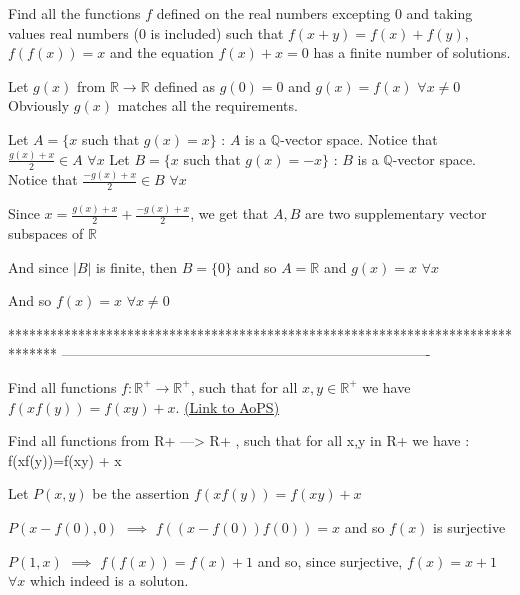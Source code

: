 \begin{solution}
	\begin{tcolorbox}Find all the functions  $ f $ defined on the real numbers excepting $ 0 $ and taking values real numbers ($ 0 $ is included) such that $ f(x+y)=f(x)+f(y) $, $ f(f(x))=x $ and the equation $ f(x)+x=0 $ has a finite number of solutions.\end{tcolorbox}
Let $g(x)$ from $\mathbb R\to\mathbb R$ defined as $g(0)=0$ and $g(x)=f(x)$ $\forall x\ne 0$
Obviously $g(x)$ matches all the requirements.

Let $A=\{x$ such that $g(x)=x\}$ : $A$ is a $\mathbb Q$-vector space. Notice that $\frac{g(x)+x}2\in A$ $\forall x$
Let $B=\{x$ such that $g(x)=-x\}$ : $B$ is a $\mathbb Q$-vector space. Notice that $\frac{-g(x)+x}2\in B$ $\forall x$

Since $x=\frac{g(x)+x}2+\frac{-g(x)+x}2$, we get that $A,B$ are two supplementary vector subspaces of $\mathbb R$

And since $|B|$ is finite, then $B=\{0\}$ and so $A=\mathbb R$ and $g(x)=x$ $\forall x$

And so $\boxed{f(x)=x}$ $\forall x\ne 0$
\end{solution}
*******************************************************************************
-------------------------------------------------------------------------------

\begin{problem}
	Find all functions $f: \mathbb{R}^+ \to \mathbb{R}^+ $, such that for all $x,y \in \mathbb{R}^+$  we have $f(xf(y))=f(xy) + x$.
	\flushright \href{https://artofproblemsolving.com/community/c6h450571}{(Link to AoPS)}
\end{problem}



\begin{solution}
	\begin{tcolorbox}Find all functions from R+ ---> R+ , such that for all x,y in R+ we have :
f(xf(y))=f(xy) + x\end{tcolorbox}
Let $P(x,y)$ be the assertion $f(xf(y))=f(xy)+x$

$P(x-f(0),0)$ $\implies$ $f((x-f(0))f(0))=x$ and so $f(x)$ is surjective

$P(1,x)$ $\implies$ $f(f(x))=f(x)+1$ and so, since surjective, $\boxed{f(x)=x+1}$ $\forall x$ which indeed is a soluton.
\end{solution}



